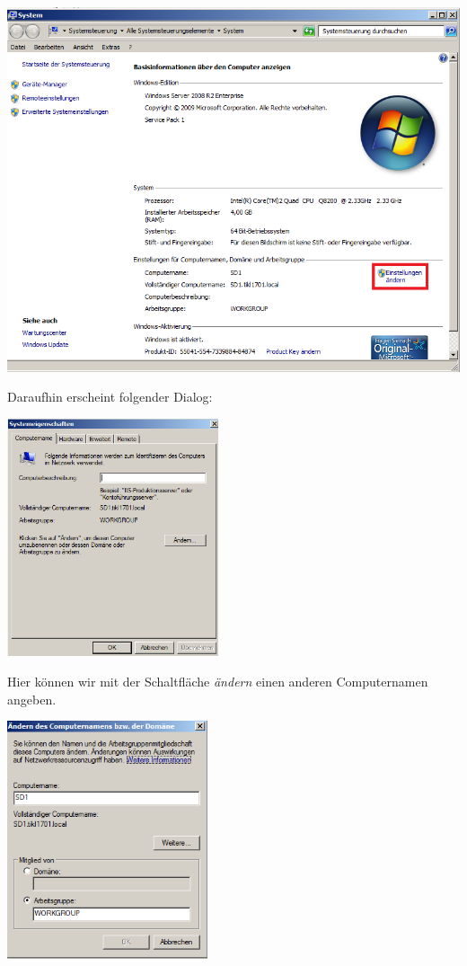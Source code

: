 \documentclass[12pt,a4paper,titlepage]{scrartcl} %
\begin{document}
	\begin{center}\includegraphics[width=14cm]{Bilder/001(Kasten)}\\ \end{center}

\newpage
Daraufhin erscheint folgender Dialog:\\

	\begin{center}\includegraphics[height=7cm]{Bilder/002}\\ \end{center}
		
Hier können wir mit der Schaltfläche \emph{ändern} einen anderen Computernamen angeben.\\

	\begin{center}\includegraphics[height=7cm]{Bilder/003}\\ \end{center}
		
\end{document}

